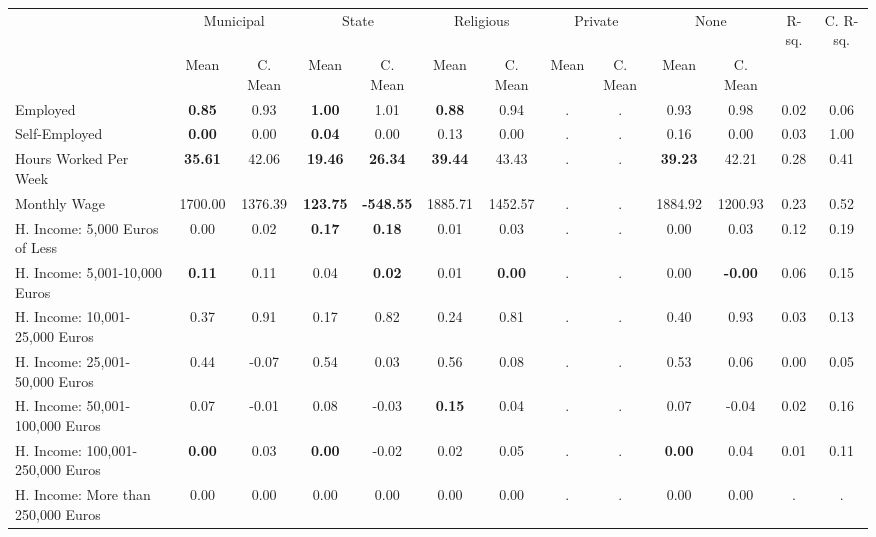 \begin{tabular}{l c c c c c c c c c c c c}
\toprule
& \multicolumn{2}{c}{Municipal} & \multicolumn{2}{c}{State} & \multicolumn{2}{c}{Religious} & \multicolumn{2}{c}{Private} & \multicolumn{2}{c}{None} & R-sq. & C. R-sq. \\
& \scriptsize Mean & \scriptsize C. Mean & \scriptsize Mean & \scriptsize C. Mean & \scriptsize Mean & \scriptsize C. Mean & \scriptsize Mean & \scriptsize C. Mean & \scriptsize Mean & \scriptsize C. Mean & & \\
\midrule
Employed & \textbf{     0.85} & 0.93 & \textbf{     1.00} & 1.01 & \textbf{     0.88} & 0.94 &         . & . &      0.93 & 0.98 &      0.02 &      0.06 \\
Self-Employed & \textbf{     0.00} & 0.00 & \textbf{     0.04} & 0.00 &      0.13 & 0.00 &         . & . &      0.16 & 0.00 &      0.03 &      1.00 \\
Hours Worked Per Week & \textbf{    35.61} & 42.06 & \textbf{    19.46} & \textbf{    26.34} & \textbf{    39.44} & 43.43 &         . & . & \textbf{    39.23} & 42.21 &      0.28 &      0.41 \\
Monthly Wage &   1700.00 & 1376.39 & \textbf{   123.75} & \textbf{  -548.55} &   1885.71 & 1452.57 &         . & . &   1884.92 & 1200.93 &      0.23 &      0.52 \\
H. Income: 5,000 Euros of Less &      0.00 & 0.02 & \textbf{     0.17} & \textbf{     0.18} &      0.01 & 0.03 &         . & . &      0.00 & 0.03 &      0.12 &      0.19 \\
H. Income: 5,001-10,000 Euros & \textbf{     0.11} & 0.11 &      0.04 & \textbf{     0.02} &      0.01 & \textbf{     0.00} &         . & . &      0.00 & \textbf{    -0.00} &      0.06 &      0.15 \\
H. Income: 10,001-25,000 Euros &      0.37 & 0.91 &      0.17 & 0.82 &      0.24 & 0.81 &         . & . &      0.40 & 0.93 &      0.03 &      0.13 \\
H. Income: 25,001-50,000 Euros &      0.44 & -0.07 &      0.54 & 0.03 &      0.56 & 0.08 &         . & . &      0.53 & 0.06 &      0.00 &      0.05 \\
H. Income: 50,001-100,000 Euros &      0.07 & -0.01 &      0.08 & -0.03 & \textbf{     0.15} & 0.04 &         . & . &      0.07 & -0.04 &      0.02 &      0.16 \\
H. Income: 100,001-250,000 Euros & \textbf{     0.00} & 0.03 & \textbf{     0.00} & -0.02 &      0.02 & 0.05 &         . & . & \textbf{     0.00} & 0.04 &      0.01 &      0.11 \\
H. Income: More than 250,000 Euros &      0.00 & 0.00 &      0.00 & 0.00 &      0.00 & 0.00 &         . & . &      0.00 & 0.00 &         . &         . \\
\bottomrule
\end{tabular}
